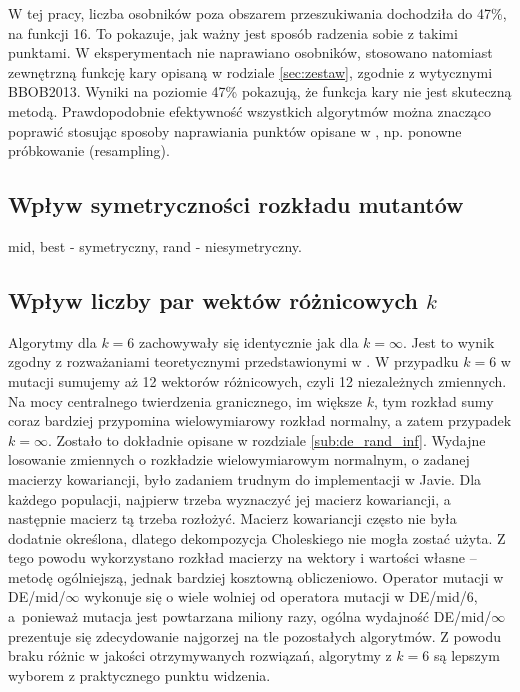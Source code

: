 \documentclass[a4paper,onecolumn,oneside,11pt,wide,floatssmall]{mwrep}
\theoremstyle{definition}
\theoremstyle{plain}%
\theoremstyle{remark}
\begin{document}
W tej pracy, liczba osobników poza obszarem przeszukiwania dochodziła do 47\%, na funkcji 16. To pokazuje,
jak ważny jest sposób radzenia sobie z takimi punktami. W eksperymentach nie 
naprawiano osobników, stosowano natomiast zewnętrzną funkcję kary opisaną w rodziale \ref{sec:zestaw},
zgodnie z wytycznymi BBOB2013. Wyniki na poziomie 47\% pokazują, że funkcja kary nie jest 
skuteczną metodą. Prawdopodobnie efektywność wszystkich algorytmów można znacząco poprawić 
stosując sposoby naprawiania punktów opisane w \cite{boundary}, np. ponowne próbkowanie (resampling).

\subsection{Wpływ symetryczności rozkładu mutantów}

mid, best - symetryczny, rand - niesymetryczny.

\subsection{Wpływ liczby par wektów różnicowych $k$}

Algorytmy dla $k = 6$ zachowywały się identycznie jak dla $k = \infty$. Jest to wynik zgodny
z rozważaniami teoretycznymi przedstawionymi w \cite{decomposition}. 
W przypadku $k = 6$ w mutacji sumujemy aż 12 wektorów różnicowych,
czyli 12 niezależnych zmiennych. Na mocy centralnego twierdzenia granicznego,
im większe $k$, tym rozkład sumy coraz bardziej przypomina wielowymiarowy rozkład normalny,
a zatem przypadek $k=\infty$. Zostało to dokładnie opisane w rozdziale \ref{sub:de_rand_inf}.
Wydajne losowanie zmiennych o rozkładzie wielowymiarowym normalnym, o zadanej
macierzy kowariancji, było zadaniem trudnym do implementacji w Javie.
Dla każdego populacji, najpierw trzeba wyznaczyć jej macierz kowariancji, a następnie macierz
tą trzeba rozłożyć. Macierz kowariancji często nie była dodatnie określona, 
dlatego dekompozycja Choleskiego nie mogła zostać użyta.
Z tego powodu wykorzystano rozkład macierzy na wektory i wartości własne -- metodę ogólniejszą, jednak
bardziej kosztowną obliczeniowo. Operator mutacji w DE/mid/$\infty$ wykonuje się o wiele
wolniej od operatora mutacji w DE/mid/6, a~ponieważ mutacja jest powtarzana miliony
razy, ogólna wydajność DE/mid/$\infty$ prezentuje się zdecydowanie najgorzej na tle pozostałych
algorytmów. Z powodu braku różnic w jakości otrzymywanych rozwiązań,
 algorytmy z $k = 6$ są lepszym wyborem z praktycznego punktu widzenia.
\end{document}
